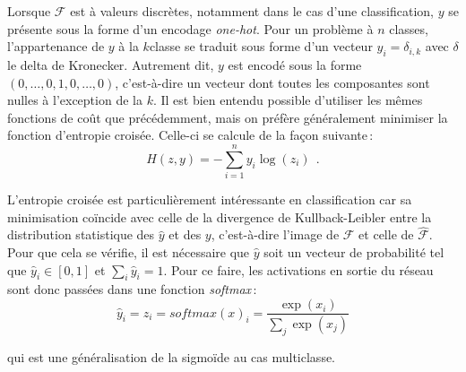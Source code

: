 Lorsque $\mathcal{F}$ est à valeurs discrètes, notamment dans le cas d'une classification, $y$ se présente sous la forme d'un encodage \emph{one-hot}. Pour un problème à $n$ classes, l'appartenance de $y$ à la $k$\ieme classe se traduit sous forme d'un vecteur $y_i = \delta_{i,k}$ avec $\delta$ le delta de Kronecker. Autrement dit, $y$ est encodé sous la forme $(0, \dots, 0, 1, 0, \dots, 0)$, c'est-à-dire un vecteur dont toutes les composantes sont nulles à l'exception de la $k$\ieme. Il est bien entendu possible d'utiliser les mêmes fonctions de coût que précédemment, mais on préfère généralement minimiser la fonction d'entropie croisée. Celle-ci se calcule de la façon suivante\,:
\begin{equation}
  H(z,y) = -\sum_{i=1}^n y_i \log(z_i)~~.
\end{equation}

L'entropie croisée est particulièrement intéressante en classification car sa minimisation coïncide avec celle de la divergence de Kullback-Leibler entre la distribution statistique des $\hat{y}$ et des $y$, c'est-à-dire l'image de $\mathcal{F}$ et celle de $\hat{\mathcal{F}}$. Pour que cela se vérifie, il est nécessaire que $\hat{y}$ soit un vecteur de probabilité tel que $\hat{y}_i \in [0,1]$ et $\sum_i \hat{y}_i = 1$. Pour ce faire, les activations en sortie du réseau sont donc passées dans une fonction \emph{softmax}\,:
\begin{equation}
\hat{y}_i = z_i = \mathit{softmax}(x)_i = \frac{\exp(x_i)}{\sum_j \exp(x_j)}
\end{equation}

qui est une généralisation de la sigmoïde au cas multiclasse.

